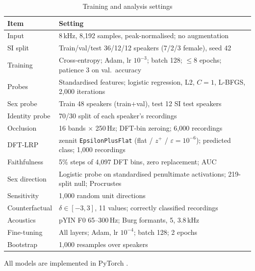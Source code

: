 \documentclass[conference]{IEEEtran}
\begin{document}
\begin{table}[t]
\caption{Training and analysis settings}
\label{tab:params}
\centering\footnotesize
\setlength{\tabcolsep}{3pt}
\begin{tabular}{@{}lp{5.3cm}@{}}
\toprule
Item & Setting \\
\midrule
Input & 8\,kHz, 8{,}192 samples, peak-normalised; no augmentation \\
SI split & Train/val/test 36/12/12 speakers (7/2/3 female), seed 42 \\
Training & Cross-entropy; Adam, lr $10^{-3}$; batch 128; $\le$8 epochs; patience 3 on val.\ accuracy \\
Probes & Standardised features; logistic regression, L2, $C=1$, L-BFGS, 2{,}000 iterations \\
Sex probe & Train 48 speakers (train+val), test 12 SI test speakers \\
Identity probe & 70/30 split of each speaker's recordings \\
Occlusion & 16 bands $\times$ 250\,Hz; DFT-bin zeroing; 6{,}000 recordings \\
DFT-LRP & zennit \texttt{EpsilonPlusFlat} (flat / $z^{+}$ / $\varepsilon=10^{-6}$); predicted class; 1{,}000 recordings \\
Faithfulness & 5\% steps of 4{,}097 DFT bins, zero replacement; AUC \\
Sex direction & Logistic probe on standardised penultimate activations; 219-split null; Procrustes \\
Sensitivity & 1{,}000 random unit directions \\
Counterfactual & $\delta\in[-3,3]$, 11 values; correctly classified recordings \\
Acoustics & pYIN F0 65--300\,Hz; Burg formants, 5, 3.8\,kHz \\
Fine-tuning & All layers; Adam, lr $10^{-4}$; batch 128; 2 epochs \\
Bootstrap & 1{,}000 resamples over speakers \\
\bottomrule
\end{tabular}
\end{table}

All models are implemented in PyTorch \cite{paszke2019pytorch}.
\end{document}
